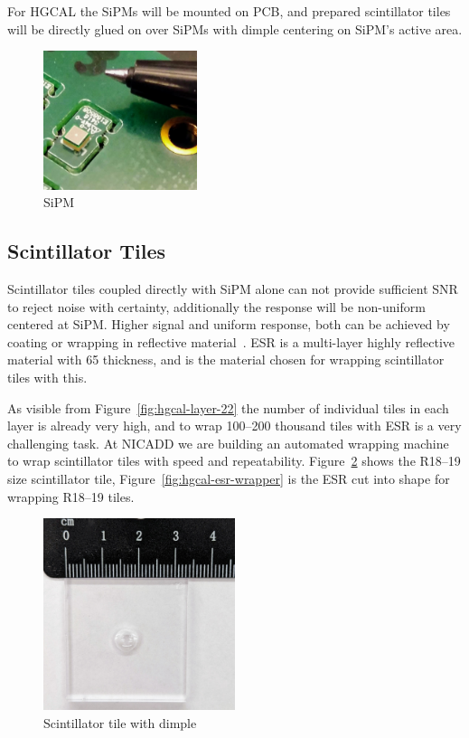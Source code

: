 For \gls{HGCAL} the \glspl{SiPM} will be mounted on \gls{PCB},
and prepared scintillator tiles will be directly glued on
over \glspl{SiPM} with dimple centering on \gls{SiPM}'s active area.

\begin{figure}[!ht]
  \centering
  \includegraphics[width=0.4\textwidth]{figures/hgcal/sipm.jpg}
  \caption[SiPM]{SiPM}%
  \label{fig:hgcal-sipm}
\end{figure}

\subsection{
  Scintillator Tiles
}

Scintillator tiles coupled directly with \gls{SiPM} alone can not provide
sufficient \gls{SNR} to reject noise with certainty, additionally
the response will be non-uniform centered at \gls{SiPM}. Higher
signal and uniform response, both can be achieved by coating or wrapping in reflective
material~\cite{niu-sipm-on-tile}. \gls{ESR}
is a multi-layer highly reflective material with 65\micron{} thickness,
and is the material chosen for wrapping scintillator tiles with this.

As visible from Figure~\ref{fig:hgcal-layer-22} the number
of individual tiles in each layer is already very high, and to wrap
100--200 thousand tiles with \gls{ESR} is a very challenging task.
At \gls{NICADD} we are building an automated wrapping machine to
wrap scintillator tiles with speed and repeatability.
Figure~\ref{fig:hgcal-scintillator-tile} shows the
R18--19 size scintillator tile, Figure~\ref{fig:hgcal-esr-wrapper}
is the \gls{ESR} cut into shape for wrapping R18--19 tiles.

\begin{figure}[!ht]
  \centering
  \includegraphics[width=0.5\textwidth]{figures/hgcal/tile_19.jpg}
  \caption[Scintillator tile with dimple]{Scintillator tile with dimple}%
  \label{fig:hgcal-scintillator-tile}
\end{figure}

